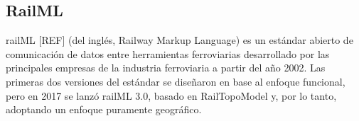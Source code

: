 \subsection{RailML}
    \label{sec:railML}
    
    railML [REF] (del inglés, Railway Markup Language) es un estándar abierto de comunicación de datos entre herramientas ferroviarias desarrollado por las principales empresas de la industria ferroviaria a partir del año 2002. Las primeras dos versiones del estándar se diseñaron en base al enfoque funcional, pero en 2017 se lanzó railML 3.0, basado en RailTopoModel y, por lo tanto, adoptando un enfoque puramente geográfico.


